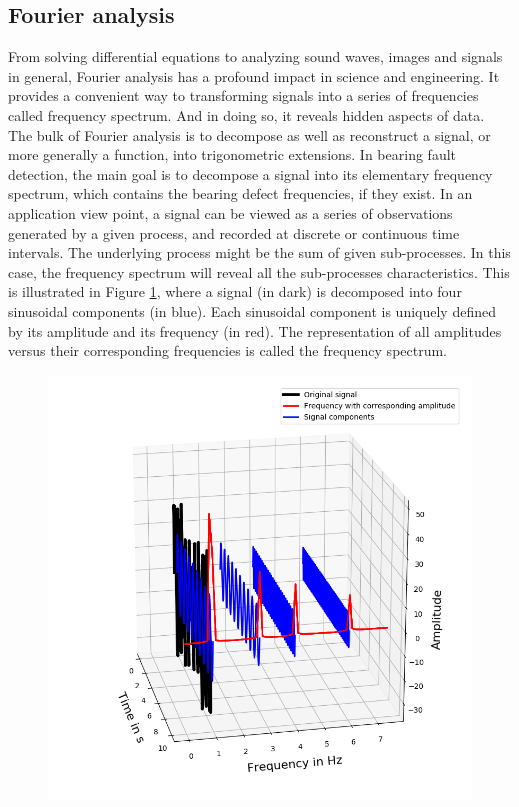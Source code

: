 \documentclass[../Main/thesis.tex]{subfiles}
\begin{document}
\subsection{Fourier analysis}
\label{sec:fouurier-analysis}
From solving differential equations to analyzing sound waves, images and signals in general, Fourier analysis has a profound impact in science and engineering. It provides a convenient way to transforming signals into a series of frequencies called frequency spectrum. And in doing so, it reveals hidden aspects of data. The bulk of Fourier analysis is to decompose as well as reconstruct a signal, or more generally a function, into trigonometric extensions. In bearing fault detection, the main goal is to decompose a signal into its elementary frequency spectrum, which contains the bearing defect frequencies, if they exist. 
\justify
  In an application view point, a signal can be viewed as a series of observations generated by a given process, and recorded at discrete or continuous time intervals. The underlying process might be the sum of given sub-processes. In this case, the frequency spectrum will reveal all the sub-processes characteristics.
This is illustrated in Figure \ref{fig:fft_domain}, where a signal (in dark) is decomposed into four sinusoidal components (in blue). Each sinusoidal component is uniquely defined by its amplitude and its frequency (in red). The representation of all amplitudes versus their corresponding frequencies is called the frequency spectrum.
\begin{figure}[H] %
   \centering
   \includegraphics[width=6in]{../fig/fft_domain} 
   \caption{}
   \label{fig:fft_domain}
\end{figure}
\end{document}
